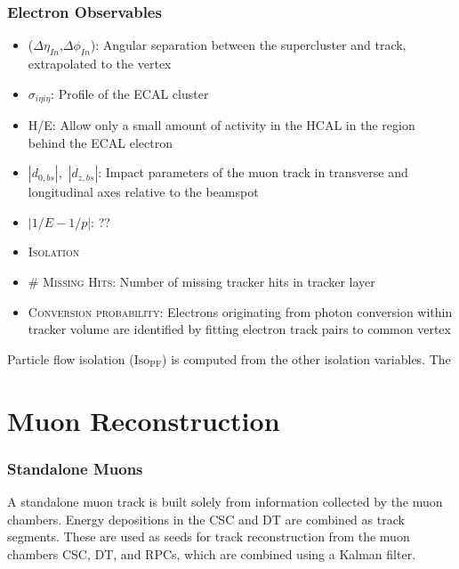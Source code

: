 \subsubsection{Electron Observables}
\begin{itemize}
    \item ($\Delta\eta_{In}$,$\Delta\phi_{In}$): Angular separation between the supercluster and track, extrapolated to the vertex
    \item $\sigma_{i\eta i\eta}$: Profile of the ECAL cluster
    \item H/E: Allow only a small amount of activity in the HCAL in the region behind the ECAL electron
    \item $|d_{0,bs}|$,~$|d_{z,bs}|$: Impact parameters of the muon track in transverse and longitudinal axes relative to the beamspot
    \item $|1/E-1/p|$:  ??
    \item \textsc{Isolation}
    \item \textsc{\# Missing Hits}: Number of missing tracker hits in tracker layer
    \item \textsc{Conversion probability}: Electrons originating from photon conversion within tracker volume are identified by fitting electron track pairs to common vertex
\end{itemize}

Particle flow isolation ($\mathrm{Iso_{PF}}$) is computed from the other isolation variables. The 
\section{Muon Reconstruction}\label{ch:reco:muon}

\subsubsection{Standalone Muons}
A standalone muon track is built solely from information collected by the muon chambers. Energy depositions in the CSC and DT are combined as track segments. These are used as seeds for track reconstruction from the muon chambers CSC, DT, and RPCs, which are combined using a Kalman filter\cite{Sirunyan:2018fpa}. 


